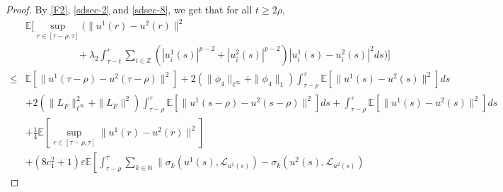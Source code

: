\documentclass[11pt]{article}
\numberwithin{equation}{section}
\theoremstyle{plain}
\begin{document}
\begin{proof}
 By \eqref{F2}, \eqref{sdsec-2} and \eqref{sdsec-8}, we get that for all $t \ge 2 \rho$,
  \begin{align}\label{sdsec-9}
  	    & \mathbb{E} 
  	           \bigg[ \sup_{r \in [\tau-\rho, \tau] } 
  	                    \Big( \| u^1(r) - u^2(r) \|^2  \nonumber\\
  	    & \qquad\qquad\quad \                 
  	                             + \lambda_2 \int_{\tau-t}^{r}
  	                                                        \sum_{ i \in \mathbb{Z}} 
  	                                                               \left( |u_{i}^1(s)|^{p-2} + |u_{i}^2(s)|^{p-2} \right)    
  	                                                                |u_{i} ^1(s) - u_{i}^2(s)|^2 
  	                                                     ds
  	                     \Big)
  	             \bigg]  \nonumber\\
 \le & \mathbb{E} 
                   \left[ \|  u^1(\tau-\rho) - u^2(\tau-\rho) \|^2 \right] 
             + 2 \left( \|\phi_{4}\|_{\ell^\infty} + \|\phi_{4}\|_1 \right)
                     	                                          \int_{\tau-\rho}^{\tau} 
                     	                                               \mathbb{E} \left[ \|u^1(s) - u^2(s) \|^2 \right] 
                     	                                           ds  \nonumber\\
      & + 2 \left( \|L_{F}\|_{\ell^\infty}^2 + \|L_{F}\|^2 \right)
                              \int_{\tau-\rho}^{\tau} 
                                   \mathbb{E}
                                        \left[ \| u^1(s-\rho) - u^2(s-\rho) \|^2 
                                        \right] 
                              ds 
           +  \int_{\tau-\rho}^{\tau} 
                                             \mathbb{E}
                                                     \left[ \| u^1(s) - u^2(s) \|^2 
                                                     \right] 
                   ds  \nonumber\\
       & + \frac{1}{4} \mathbb{E} 
                     \left[ \sup_{r \in [\tau-\rho, \tau] }  \|u^1(r) - u^2(r) \|^2 
                     \right]  \nonumber\\
       & + \left(8 c_1^2 + 1 \right) \varepsilon
                \mathbb{E}
                      \left[ \int_{\tau-\rho}^{\tau}
                                   \sum_{k \in \mathbb{N} }
                                               \| \sigma_k(u^1(s), \mathcal{L}_{u^1(s)}) 
                                                    - \sigma_k(u^2(s), \mathcal{L}_{u^2(s)})

\end{align}
\end{proof}
\end{document}
